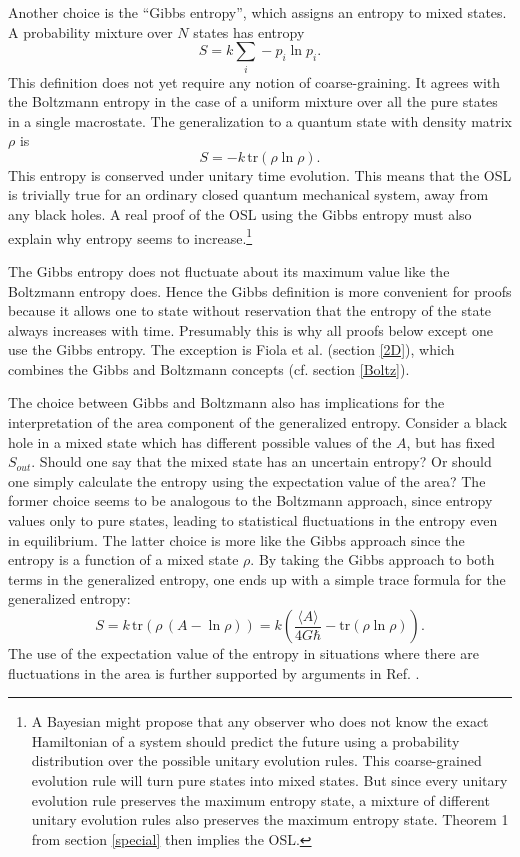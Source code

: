 \documentclass{article}
\begin{document}
Another choice is the ``Gibbs entropy'', which assigns an entropy to mixed states.  A probability mixture over $N$ states has entropy
\begin{equation}
S = k\sum_i -p_i\ln p_i.
\end{equation}
This definition does not yet require any notion of coarse-graining.  It agrees with the Boltzmann entropy in the case of a uniform mixture over all the pure states in a single macrostate.  The generalization to a quantum state with density matrix $\rho$ is
\begin{equation}
S = -k\,\mathrm{tr}(\rho \ln \rho).
\end{equation} 
This entropy is conserved under unitary time evolution.  This means that the OSL is trivially true for an ordinary closed quantum mechanical system, away from any black holes.  A real proof of the OSL using the Gibbs entropy must also explain why entropy seems to increase.\footnote{A Bayesian might propose that any observer who does not know the exact Hamiltonian of a system should predict the future using a probability distribution over the possible unitary evolution rules.  This coarse-grained evolution rule will turn pure states into mixed states.  But since every unitary evolution rule preserves the maximum entropy state, a mixture of different unitary evolution rules also preserves the maximum entropy state.  Theorem 1 from section \ref{special} then implies the OSL.}

The Gibbs entropy does not fluctuate about its maximum value like the Boltzmann entropy does.  Hence the Gibbs definition is more convenient for proofs because it allows one to state without reservation that the entropy of the state always increases with time.  Presumably this is why all proofs below except one use the Gibbs entropy.  The exception is Fiola et al. \cite{fiola94} (section \ref{2D}), which combines the Gibbs and Boltzmann concepts (cf. section \ref{Boltz}).

The choice between Gibbs and Boltzmann also has implications for the interpretation of the area component of the generalized entropy.  Consider a black hole in a mixed state which has different possible values of the $A$, but has fixed $S_{out}$.  Should one say that the mixed state has an uncertain entropy?  Or should one simply calculate the entropy using the expectation value of the area?  The former choice seems to be analogous to the Boltzmann approach, since entropy values only to pure states, leading to statistical fluctuations in the entropy even in equilibrium.  The latter choice is more like the Gibbs approach since the entropy is a function of a mixed state $\rho$.  By taking the Gibbs approach to both terms in the generalized entropy, one ends up with a simple trace formula for the generalized entropy:
\begin{equation}
S = k\,\mathrm{tr}(\rho\,(A - \ln \rho)) = k \left(\frac{\langle A \rangle}{4G \hbar} - 
\mathrm{tr}(\rho\ln \rho) \right).
\end{equation}
The use of the expectation value of the entropy in situations where there are fluctuations in the area is further supported by arguments in Ref. \cite{SS99}.
\end{document}
